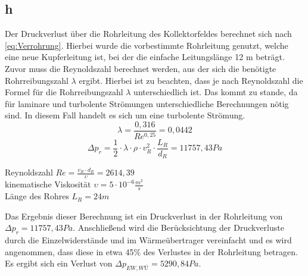 \subsection{h}
Der Druckverlust über die Rohrleitung des Kollektorfeldes berechnet sich nach \autoref{eq:Verrohrung}.
Hierbei wurde die vorbestimmte Rohrleitung genutzt, welche eine neue Kupferleitung ist,
bei der die einfache Leitungslänge 12 m beträgt.\\
Zuvor muss die Reynoldszahl berechnet werden, aus der sich die benötigte Rohrreibungszahl $\lambda$ 
ergibt. Hierbei ist zu beachten, dass je nach Reynoldszahl die Formel für die Rohrreibungszahl $\lambda$
unterschiedlich ist. Das kommt zu stande, da für laminare und turbolente Strömungen unterschiedliche
Berechnungen nötig sind. In diesem Fall handelt es sich um eine turbolente Strömung.\\
\begin{equation}
    \lambda =  \frac{0,316}{Re^{0,25}} = 0,0442
\end{equation}
\begin{equation}
    \Delta p_r = \frac{1}{2} \cdot \lambda \cdot \rho \cdot v^2_R \cdot \frac{L_R}{d_R} = 11757,43 Pa
        \label{eq:Verrohrung}
\end{equation}
\vspace{\baselineskip}
\begin{center}
    Reynoldszahl $Re = \frac{v_R \cdot d_R}{\upsilon} = 2614,39$\\
    kinematische Viskosität $\upsilon =5 \cdot 10^{-6} \frac{m^2}{s}$\\
    Länge des Rohres $L_R = 24 m$
\end{center}

Das Ergebnis dieser Berechnung ist ein Druckverlust in der Rohrleitung von $\Delta p_r = 11757,43 Pa$.
Anschließend wird die Berücksichtung der Druckverluste durch die Einzelwiderstände und im Wärmeübertrager
vereinfacht und es wird angenommen, dass diese in etwa 45\% des Verlustes in der Rohrleitung betragen.
Es ergibt sich ein Verlust von $\Delta p_{EW,WÜ} = 5290,84 Pa$.